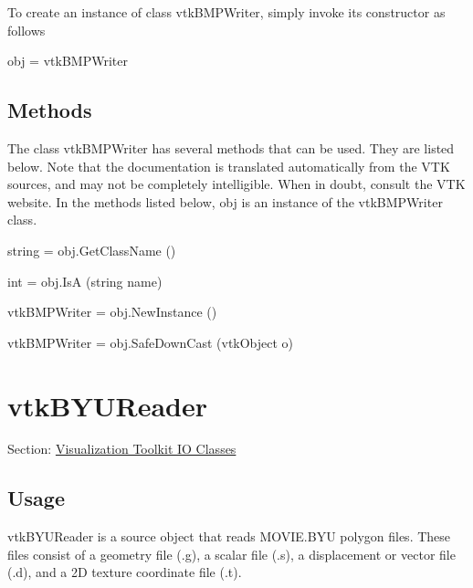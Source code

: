 To create an instance of class vtk\-B\-M\-P\-Writer, simply invoke its constructor as follows \begin{DoxyVerb}  obj = vtkBMPWriter
\end{DoxyVerb}
 \hypertarget{vtkwidgets_vtkxyplotwidget_Methods}{}\subsection{Methods}\label{vtkwidgets_vtkxyplotwidget_Methods}
The class vtk\-B\-M\-P\-Writer has several methods that can be used. They are listed below. Note that the documentation is translated automatically from the V\-T\-K sources, and may not be completely intelligible. When in doubt, consult the V\-T\-K website. In the methods listed below, {\ttfamily obj} is an instance of the vtk\-B\-M\-P\-Writer class. 
\begin{DoxyItemize}
\item {\ttfamily string = obj.\-Get\-Class\-Name ()}  
\item {\ttfamily int = obj.\-Is\-A (string name)}  
\item {\ttfamily vtk\-B\-M\-P\-Writer = obj.\-New\-Instance ()}  
\item {\ttfamily vtk\-B\-M\-P\-Writer = obj.\-Safe\-Down\-Cast (vtk\-Object o)}  
\end{DoxyItemize}\hypertarget{vtkio_vtkbyureader}{}\section{vtk\-B\-Y\-U\-Reader}\label{vtkio_vtkbyureader}
Section\-: \hyperlink{sec_vtkio}{Visualization Toolkit I\-O Classes} \hypertarget{vtkwidgets_vtkxyplotwidget_Usage}{}\subsection{Usage}\label{vtkwidgets_vtkxyplotwidget_Usage}
vtk\-B\-Y\-U\-Reader is a source object that reads M\-O\-V\-I\-E.\-B\-Y\-U polygon files. These files consist of a geometry file (.g), a scalar file (.s), a displacement or vector file (.d), and a 2\-D texture coordinate file (.t).

